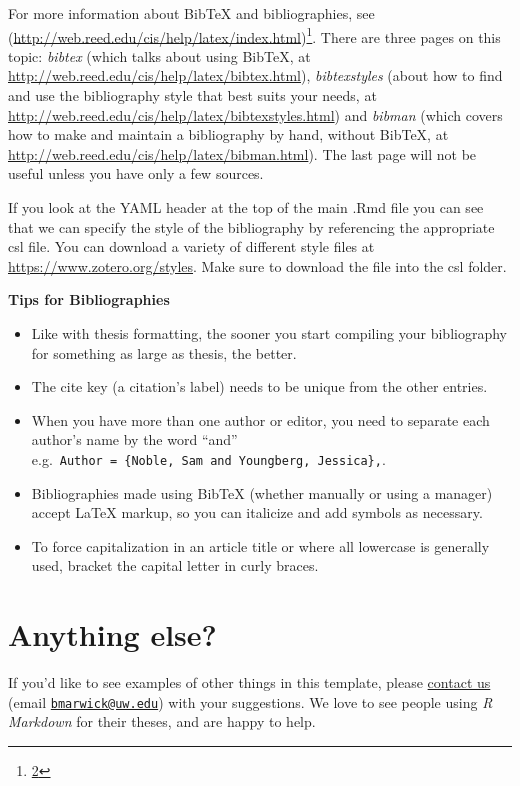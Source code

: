 \documentclass[twoside,12pt,final]{ucthesis-CA2012}
\providecommand{\tightlist}{%
  \setlength{\itemsep}{0pt}\setlength{\parskip}{0pt}}
\begin{document}
\begin{ucmainmatter}
For more information about BibTeX and bibliographies, see (\url{http://web.reed.edu/cis/help/latex/index.html})\footnote{\protect\hyperlink{ref-reedweb2007}{2}}. There are three pages on this topic: \emph{bibtex} (which talks about using BibTeX, at \url{http://web.reed.edu/cis/help/latex/bibtex.html}), \emph{bibtexstyles} (about how to find and use the bibliography style that best suits your needs, at \url{http://web.reed.edu/cis/help/latex/bibtexstyles.html}) and \emph{bibman} (which covers how to make and maintain a bibliography by hand, without BibTeX, at \url{http://web.reed.edu/cis/help/latex/bibman.html}). The last page will not be useful unless you have only a few sources.

If you look at the YAML header at the top of the main .Rmd file you can see that we can specify the style of the bibliography by referencing the appropriate csl file. You can download a variety of different style files at \url{https://www.zotero.org/styles}. Make sure to download the file into the csl folder.

\textbf{Tips for Bibliographies}
\begin{itemize}
\tightlist
\item
  Like with thesis formatting, the sooner you start compiling your bibliography for something as large as thesis, the better.
\item
  The cite key (a citation's label) needs to be unique from the other entries.
\item
  When you have more than one author or editor, you need to separate each author's name by the word ``and'' e.g.~\texttt{Author\ =\ \{Noble,\ Sam\ and\ Youngberg,\ Jessica\},}.
\item
  Bibliographies made using BibTeX (whether manually or using a manager) accept LaTeX markup, so you can italicize and add symbols as necessary.
\item
  To force capitalization in an article title or where all lowercase is generally used, bracket the capital letter in curly braces.
\end{itemize}
\hypertarget{anything-else}{%
\section{Anything else?}\label{anything-else}}

If you'd like to see examples of other things in this template, please \href{https://github.com/benmarwick/huskydown/issues/new}{contact us} (email \href{mailto:bmarwick@uw.edu}{\nolinkurl{bmarwick@uw.edu}}) with your suggestions. We love to see people using \emph{R Markdown} for their theses, and are happy to help.


\end{ucmainmatter}
\end{document}
